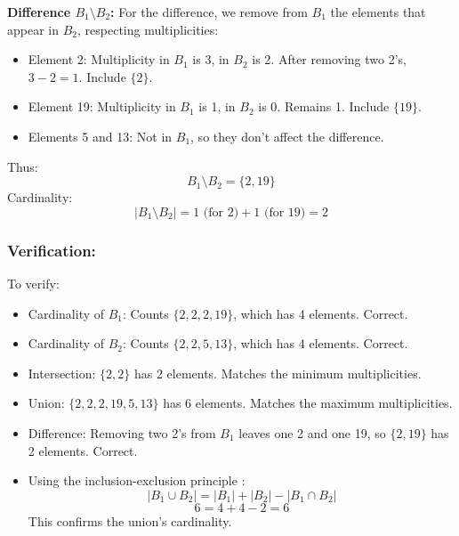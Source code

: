 \documentclass[12pt, a4paper, twoside]{report} %
\begin{document}
\textbf{Difference \( B_1 \setminus B_2 \):}
For the difference, we remove from \( B_1 \) the elements that appear in \( B_2 \), respecting multiplicities:
\begin{itemize}
  \item Element 2: Multiplicity in \( B_1 \) is 3, in \( B_2 \) is 2. After removing two 2’s, \( 3 - 2 = 1 \). Include \( \{2\} \).
  \item Element 19: Multiplicity in \( B_1 \) is 1, in \( B_2 \) is 0. Remains 1. Include \( \{19\} \).
  \item Elements 5 and 13: Not in \( B_1 \), so they don’t affect the difference.
\end{itemize}
Thus:
\[
B_1 \setminus B_2 = \{2, 19\}
\]
Cardinality:
\[
|B_1 \setminus B_2| = 1 \text{ (for 2)} + 1 \text{ (for 19)} = 2
\]

\subsubsection*{Verification:}
To verify:
\begin{itemize}
  \item Cardinality of \( B_1 \): Counts \( \{2, 2, 2, 19\} \), which has 4 elements. Correct.
  \item Cardinality of \( B_2 \): Counts \( \{2, 2, 5, 13\} \), which has 4 elements. Correct.
  \item Intersection: \( \{2, 2\} \) has 2 elements. Matches the minimum multiplicities.
  \item Union: \( \{2, 2, 2, 19, 5, 13\} \) has 6 elements. Matches the maximum multiplicities.
  \item Difference: Removing two 2’s from \( B_1 \) leaves one 2 and one 19, so \( \{2, 19\} \) has 2 elements. Correct.
  \item Using the inclusion-exclusion principle \cite{rosen2019}:
    \[
    |B_1 \cup B_2| = |B_1| + |B_2| - |B_1 \cap B_2|
    \]
    \[
    6 = 4 + 4 - 2 = 6
    \]
    This confirms the union’s cardinality.
\end{itemize}
\end{document}
